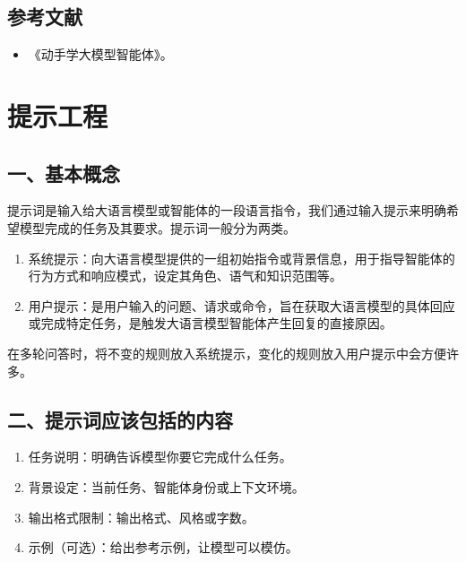 \hypertarget{ux53c2ux8003ux6587ux732e-115}{%
\subsection{参考文献}\label{ux53c2ux8003ux6587ux732e-115}}

\begin{itemize}
\tightlist
\item
  《动手学大模型智能体》。
\end{itemize}

\clearpage

\hypertarget{ux63d0ux793aux5de5ux7a0b}{%
\section{提示工程}\label{ux63d0ux793aux5de5ux7a0b}}

\hypertarget{ux4e00ux57faux672cux6982ux5ff5}{%
\subsection{一、基本概念}\label{ux4e00ux57faux672cux6982ux5ff5}}

提示词是输入给大语言模型或智能体的一段语言指令，我们通过输入提示来明确希望模型完成的任务及其要求。提示词一般分为两类。

\begin{enumerate}
\def\labelenumi{\arabic{enumi}.}
\item
  系统提示：向大语言模型提供的一组初始指令或背景信息，用于指导智能体的行为方式和响应模式，设定其角色、语气和知识范围等。
\item
  用户提示：是用户输入的问题、请求或命令，旨在获取大语言模型的具体回应或完成特定任务，是触发大语言模型智能体产生回复的直接原因。
\end{enumerate}

在多轮问答时，将不变的规则放入系统提示，变化的规则放入用户提示中会方便许多。

\hypertarget{ux4e8cux63d0ux793aux8bcdux5e94ux8be5ux5305ux62ecux7684ux5185ux5bb9}{%
\subsection{二、提示词应该包括的内容}\label{ux4e8cux63d0ux793aux8bcdux5e94ux8be5ux5305ux62ecux7684ux5185ux5bb9}}

\begin{enumerate}
\def\labelenumi{\arabic{enumi}.}
\item
  任务说明：明确告诉模型你要它完成什么任务。
\item
  背景设定：当前任务、智能体身份或上下文环境。
\item
  输出格式限制：输出格式、风格或字数。
\item
  示例（可选）：给出参考示例，让模型可以模仿。
\end{enumerate}

